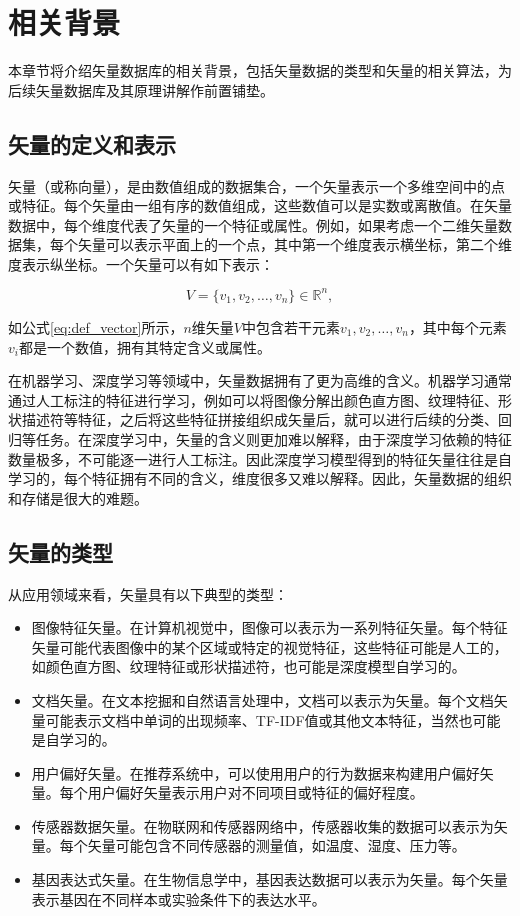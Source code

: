 \section{相关背景}

本章节将介绍矢量数据库的相关背景，包括矢量数据的类型和矢量的相关算法，为后续矢量数据库及其原理讲解作前置铺垫。

\subsection{矢量的定义和表示}

矢量（或称向量），是由数值组成的数据集合，一个矢量表示一个多维空间中的点或特征。每个矢量由一组有序的数值组成，这些数值可以是实数或离散值。在矢量数据中，每个维度代表了矢量的一个特征或属性。例如，如果考虑一个二维矢量数据集，每个矢量可以表示平面上的一个点，其中第一个维度表示横坐标，第二个维度表示纵坐标。一个矢量可以有如下表示：

\begin{equation}
    V=\{v_1,v_2,\dots,v_n\}\in\mathbb{R}^{n},
    \label{eq:def_vector}
\end{equation}

如公式\ref{eq:def_vector}所示，$n$维矢量$V$中包含若干元素$v_1,v_2,\dots,v_n$，其中每个元素$v_i$都是一个数值，拥有其特定含义或属性。

在机器学习、深度学习等领域中，矢量数据拥有了更为高维的含义。机器学习通常通过人工标注的特征进行学习，例如可以将图像分解出颜色直方图、纹理特征、形状描述符等特征，之后将这些特征拼接组织成矢量后，就可以进行后续的分类、回归等任务。在深度学习中，矢量的含义则更加难以解释，由于深度学习依赖的特征数量极多，不可能逐一进行人工标注。因此深度学习模型得到的特征矢量往往是自学习的，每个特征拥有不同的含义，维度很多又难以解释。因此，矢量数据的组织和存储是很大的难题。

\subsection{矢量的类型}

从应用领域来看，矢量具有以下典型的类型：

\begin{itemize}
\item 图像特征矢量。在计算机视觉中，图像可以表示为一系列特征矢量。每个特征矢量可能代表图像中的某个区域或特定的视觉特征，这些特征可能是人工的，如颜色直方图、纹理特征或形状描述符，也可能是深度模型自学习的。
\item 文档矢量。在文本挖掘和自然语言处理中，文档可以表示为矢量。每个文档矢量可能表示文档中单词的出现频率、TF-IDF值或其他文本特征，当然也可能是自学习的。
\item 用户偏好矢量。在推荐系统中，可以使用用户的行为数据来构建用户偏好矢量。每个用户偏好矢量表示用户对不同项目或特征的偏好程度。
\item 传感器数据矢量。在物联网和传感器网络中，传感器收集的数据可以表示为矢量。每个矢量可能包含不同传感器的测量值，如温度、湿度、压力等。
\item 基因表达式矢量。在生物信息学中，基因表达数据可以表示为矢量。每个矢量表示基因在不同样本或实验条件下的表达水平。
\end{itemize}

